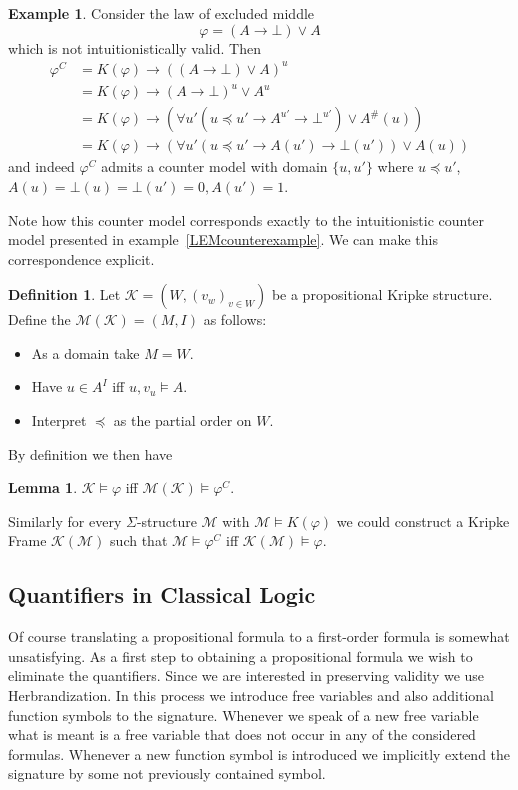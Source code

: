 \documentclass[a4paper,12pt]{report}
\theoremstyle{definition}
\theoremstyle{definition}
\theoremstyle{definition}
\newtheorem{lemma}[theorem]{Lemma}
\theoremstyle{definition}
\theoremstyle{definition}
\newtheorem{definition}[theorem]{Definition}
\theoremstyle{definition}
\newtheorem{example}[theorem]{Example}
\theoremstyle{definition}
\begin{document}
	\begin{example}
		Consider the law of excluded middle $$\varphi = (A\to \bot)\vee A$$which is not intuitionistically valid. Then
		\begin{align*}
			\varphi^{C} &= K(\varphi)\to ((A\to \bot)\vee A)^u\\
						 &= K(\varphi)\to (A\to \bot)^u\vee A^u\\
						 &= K(\varphi)\to (\forall u'( u\preceq u' \to A^{u'}\to \bot^{u'})\vee A^\#(u))\\
						 &= K(\varphi)\to (\forall u' (u\preceq u' \to A(u')\to \bot(u'))\vee A(u))
		\end{align*}
		and indeed $\varphi^{C}$ admits a counter model with domain $\{u, u'\}$ where $u \preceq u'$, $A(u) = \bot(u) = \bot(u') = 0, A(u') = 1$.
	\end{example}
	
	Note how this counter model corresponds exactly to the intuitionistic counter model presented in example~\ref{LEMcounterexample}. We can make this correspondence explicit.
	
	\begin{definition}
		Let $\mathcal K = (W, (v_w)_{v\in W})$ be a propositional Kripke structure. Define the $\mathcal M(\mathcal K) = (M, I)$ as follows:
		\begin{itemize}
			\item As a domain take $M = W$.
			\item Have $u\in A^{I}$ iff $u, v_u\models A$.
			\item Interpret $\preceq$ as the partial order on $W$.
		\end{itemize}
	\end{definition}

	\noindent By definition we then have
	\begin{lemma}
		$\mathcal K\models \varphi$ iff $\mathcal M(\mathcal K)\models \varphi^{C}$.
	\end{lemma}
	
	\indent Similarly for every $\Sigma$-structure $\mathcal M$ with $\mathcal M\models K(\varphi)$ we could construct a Kripke Frame $\mathcal K(\mathcal M)$ such that $\mathcal M\models \varphi^C$ iff $\mathcal K(\mathcal M)\models \varphi$.
	

	\subsection{Quantifiers in Classical Logic}
	
	Of course translating a propositional formula to a first-order formula is somewhat unsatisfying. As a first step to obtaining a propositional formula we wish to eliminate the quantifiers. Since we are interested in preserving validity we use Herbrandization. In this process we introduce free variables and also additional function symbols to the signature. Whenever we speak of a new free variable what is meant is a free variable that does not occur in any of the considered formulas. Whenever a new function symbol is introduced we implicitly extend the signature by some not previously contained symbol.
	
\end{document}

